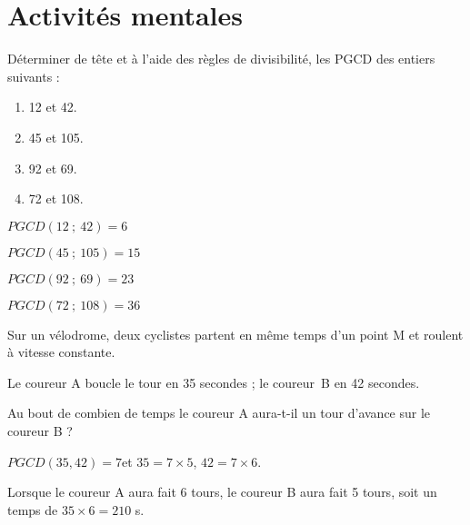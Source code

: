 \documentclass{cornouaille}
\begin{document}
\tableofcontents


\section{Activités mentales}

\begin{exercice}
Déterminer de tête et à l'aide des règles de divisibilité,
les PGCD des entiers suivants :


\begin{multicols}{2}
\begin{enumerate}
\item 12 et 42.
\item 45 et 105.
\item 92 et 69.
\item 72 et 108.
\end{enumerate}
\end{multicols}
\end{exercice}
\begin{solution}
\begin{colenumerate}{2}
\item $PGCD(12\ ;\ 42)=6$
\item $PGCD(45\ ;\ 105)=15$
\item $PGCD(92\ ;\ 69)=23$
\item $PGCD(72\ ;\ 108)=36$
\end{colenumerate}
\end{solution}

\begin{exercice}
Sur un vélodrome, deux cyclistes partent en même temps d'un point M et roulent à vitesse
constante.

Le coureur A boucle le tour en 35 secondes ; le coureur~B en 42
secondes.

Au bout de combien de temps le coureur A aura-t-il un tour d'avance sur le coureur B ?
\end{exercice}
\begin{solution}
  $PGCD(35,42)=7$\enskip et \enskip $35=7\times5$,\enskip
  $42=7\times6$.

  Lorsque le coureur A aura fait 6 tours, le coureur B aura fait 5
  tours, soit un temps de \enskip $35\times 6=210$ s.
\end{solution}
\end{document}
